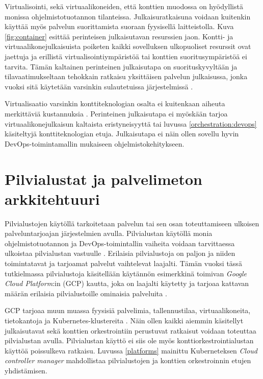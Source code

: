 Virtualisointi, sekä virtuaalikoneiden, että konttien muodossa on hyödyllistä monissa ohjelmistotuotannon tilanteissa.
Julkaisuratkaisuna voidaan kuitenkin käyttää myös palvelun suorittamista suoraan fyysisellä laitteistolla.
Kuva \ref{fig:container} esittää perinteisen julkaisutavan resurssien jaon.
Kontti- ja virtuaalikonejulkaisuista poiketen kaikki sovelluksen ulkopuoliset resurssit ovat jaettuja ja erillistä virtualisointiympäristöä tai konttien suoritusympäristöä ei tarvita. 
Tämän kaltainen perinteinen julkaisutapa on suorituskyvyltään ja tilavaatimukseltaan tehokkain ratkaisu yksittäisen palvelun julkaisussa, jonka vuoksi sitä käytetään varsinkin sulautetuissa järjestelmissä \cite{Heiser08}.

Virtualisaatio varsinkin konttiteknologian osalta ei kuitenkaan aiheuta merkittäviä kustannuksia \cite{torrez19}.
Perinteinen julkaisutapa ei myöskään tarjoa virtuaalikonejulkaisun kaltaista eristyneisyyttä tai luvussa \ref{orchestration:devops} käsiteltyjä konttiteknologian etuja.
Julkaisutapa ei näin ollen sovellu hyvin DevOps-toimintamallin mukaiseen ohjelmistokehitykseen.

\section{Pilvialustat ja palvelimeton arkkitehtuuri}

Pilvialustojen käytöllä tarkoitetaan palvelun tai sen osan toteuttamiseen ulkoisen palveluntarjoajan järjestelmien avulla.
Pilvialustan käytöllä monia ohjelmistotuotannon ja DevOps-toimintallin vaiheita voidaan tarvittaessa ulkoistaa pilvialustan vastuulle \cite{tomarchio20}.
Erilaisia pilvialustoja on paljon ja niiden toimintatavat ja tarjoamat palvelut vaihtelevat laajalti.
Tämän vuoksi tässä tutkielmassa pilvialustoja käsitellään käytännön esimerkkinä toimivan \textit{Google Cloud Platform}:in (GCP) kautta, joka on laajalti käytetty ja tarjoaa kattavan määrän erilaisia pilvialustoille ominaisia palveluita \cite{ahuja20}.

GCP tarjoaa muun muassa fyysisiä palvelimia, tallennustilaa, virtuaalikoneita, tietokantoja ja Kubernetes-klustereita \cite{Products23}.
Näin ollen kaikki aiemmin käsitellyt julkaisutavat sekä konttien orkestrointiin perustuvat ratkaisut voidaan toteuttaa pilvialustan avulla.
Pilvialustan käyttö ei siis ole myös konttiorkestrointialustan käyttöä poissulkeva ratkaisu.
Luvussa \ref{platforms} mainittu Kuberneteksen \textit{Cloud controller manager} mahdollistaa pilvialustojen ja konttien orkestroinnin etujen yhdistämisen.

